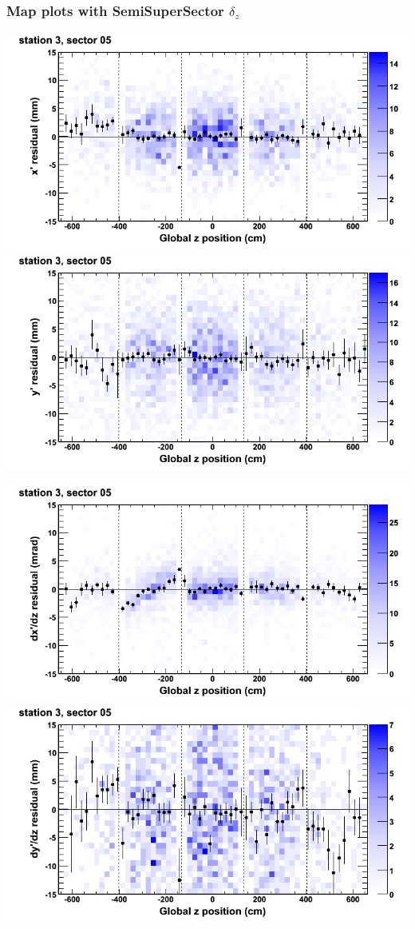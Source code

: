 \documentclass[compress]{beamer}
\begin{document}
\begin{frame}
\frametitle{Map plots with SemiSuperSector $\delta_z$}
\includegraphics[width=0.5\linewidth]{zfit_mapplots/DTvsz_st3sec05_x.png}
\includegraphics[width=0.5\linewidth]{zfit_mapplots/DTvsz_st3sec05_y.png}

\includegraphics[width=0.5\linewidth]{zfit_mapplots/DTvsz_st3sec05_dxdz.png}
\includegraphics[width=0.5\linewidth]{zfit_mapplots/DTvsz_st3sec05_dydz.png}
\end{frame}
\end{document}
